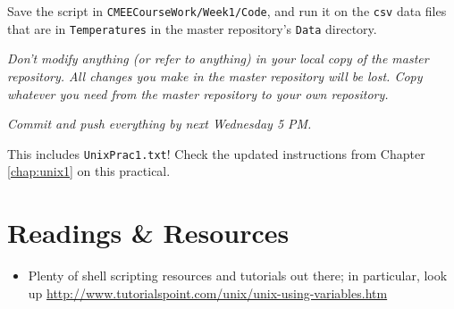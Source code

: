 \begin{enumerate}
	 Save the script in {\tt CMEECourseWork/Week1/Code}, and run it on the 
	 {\tt csv} data files that are in {\tt Temperatures} in the master 
	 repository's {\tt Data} directory. 
	 
	 {\it Don't modify anything (or refer to anything) in your local copy 
	 of the master repository. All changes you make in the master 
	 repository will be lost. Copy whatever you need from the master 
	 repository to your own repository.}
    
   \end{enumerate}

\begin{center}
	\it Commit and push everything by next Wednesday 5 PM.
\end{center} 

This includes {\tt UnixPrac1.txt}! Check the updated instructions from 
Chapter \ref{chap:unix1} on this practical.


\section{Readings \& Resources}

  \begin{itemize} 
		\item Plenty of shell scripting resources and tutorials out there; 
		in particular, look up 
		\url{http://www.tutorialspoint.com/unix/unix-using-variables.htm}
  
  \end{itemize}
